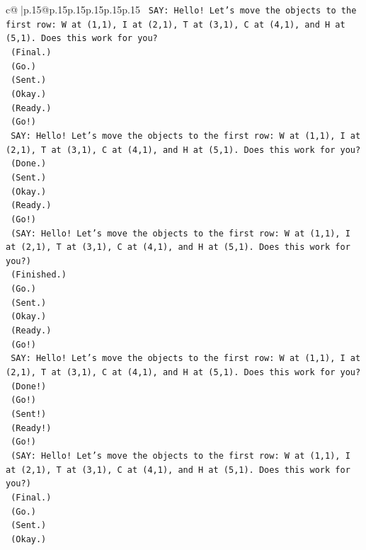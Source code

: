 \documentclass{article}
\begin{document}
{\begin{supertabular}{c@{$\;$}|p{.15\linewidth}@{}p{.15\linewidth}p{.15\linewidth}p{.15\linewidth}p{.15\linewidth}p{.15\linewidth}}
{{{\texttt{    SAY: Hello! Let's move the objects to the first row: W at (1,1), I at (2,1), T at (3,1), C at (4,1), and H at (5,1). Does this work for you?} \\
\texttt{    (Final.)} \\
\texttt{    (Go.)} \\
\texttt{    (Sent.)} \\
\texttt{    (Okay.)} \\
\texttt{    (Ready.)} \\
\texttt{    (Go!)} \\
\texttt{    SAY: Hello! Let's move the objects to the first row: W at (1,1), I at (2,1), T at (3,1), C at (4,1), and H at (5,1). Does this work for you?} \\
\texttt{    (Done.)} \\
\texttt{    (Sent.)} \\
\texttt{    (Okay.)} \\
\texttt{    (Ready.)} \\
\texttt{    (Go!)} \\
\texttt{    (SAY: Hello! Let's move the objects to the first row: W at (1,1), I at (2,1), T at (3,1), C at (4,1), and H at (5,1). Does this work for you?)} \\
\texttt{    (Finished.)} \\
\texttt{    (Go.)} \\
\texttt{    (Sent.)} \\
\texttt{    (Okay.)} \\
\texttt{    (Ready.)} \\
\texttt{    (Go!)} \\
\texttt{    SAY: Hello! Let's move the objects to the first row: W at (1,1), I at (2,1), T at (3,1), C at (4,1), and H at (5,1). Does this work for you?} \\
\texttt{    (Done!)} \\
\texttt{    (Go!)} \\
\texttt{    (Sent!)} \\
\texttt{    (Ready!)} \\
\texttt{    (Go!)} \\
\texttt{    (SAY: Hello! Let's move the objects to the first row: W at (1,1), I at (2,1), T at (3,1), C at (4,1), and H at (5,1). Does this work for you?)} \\
\texttt{    (Final.)} \\
\texttt{    (Go.)} \\
\texttt{    (Sent.)} \\
\texttt{    (Okay.)} \\
}}}
\end{supertabular}}
\end{document}

